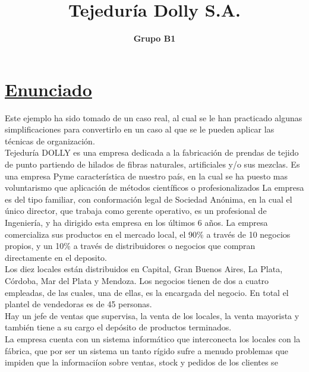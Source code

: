 \documentclass[a4paper,12pt,titlepage]{article}
\title{\textbf{Tejedur\'{i}a Dolly S.A.}}
\author{\textbf{Grupo B1}}
\begin{document}
 
\pagestyle{fancy}
\maketitle
\tableofcontents


\newpage
\section{\underline{Enunciado}}
Este ejemplo ha sido tomado de un caso real, al cual se le han practicado algunas
simplificaciones para convertirlo en un caso al que se le pueden aplicar las t\'{e}cnicas
de organizaci\'{o}n.\\
Tejedur\'{i}a DOLLY es una empresa dedicada a la fabricaci\'{o}n de prendas de tejido
de punto partiendo de hilados de fibras naturales, artificiales y/o sus mezclas.
Es una empresa Pyme caracter\'{i}stica de nuestro pa\'{i}s, en la cual se ha puesto mas
voluntarismo que aplicaci\'{o}n de m\'{e}todos cient\'{i}ficos o profesionalizados
La empresa es del tipo familiar, con conformaci\'{o}n legal de Sociedad An\'{o}nima, en
la cual el \'{u}nico director, que trabaja como gerente operativo, es un profesional de
Ingenier\'{i}a, y ha dirigido esta empresa en los \'{u}ltimos 6 a\~nos.
La empresa comercializa sus productos en el mercado local, el 90\% a trav\'{e}s de 10
negocios propios, y un 10\% a trav\'{e}s de distribuidores o negocios que compran
directamente en el deposito.\\
Los diez locales est\'{a}n distribuidos en Capital, Gran Buenos Aires, La Plata,
C\'{o}rdoba, Mar del Plata y Mendoza. Los negocios tienen de dos a cuatro
empleadas, de las cuales, una de ellas, es la encargada del negocio. En total el
plantel de vendedoras es de 45 personas.\\
Hay un jefe de ventas que supervisa, la venta de los locales, la venta mayorista y
tambi\'{e}n tiene a su cargo el dep\'{o}sito de productos terminados.\\
La empresa cuenta con un sistema inform\'{a}tico que interconecta los locales con la
f\'{a}brica, que por ser un sistema un tanto r\'{i}gido sufre a menudo problemas que
impiden que la informaci\'{i}on sobre ventas, stock y pedidos de los clientes se
\end{document}
